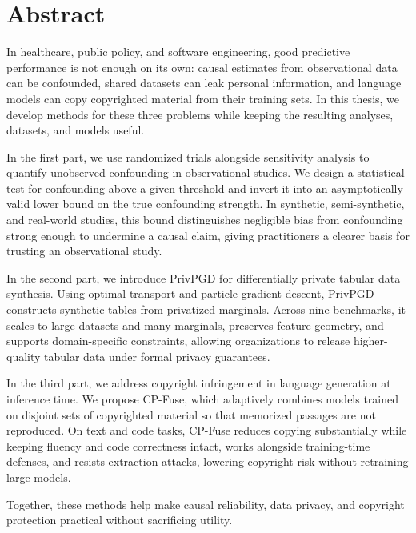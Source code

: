 \begingroup
\let\clearpage\relax
\let\cleardoublepage\relax
\chapter*{Abstract}

In healthcare, public policy, and software engineering, good predictive performance is not enough on its own: causal estimates from observational data can be confounded, shared datasets can leak personal information, and language models can copy copyrighted material from their training sets. In this thesis, we develop methods for these three problems while keeping the resulting analyses, datasets, and models useful.

In the first part, we use randomized trials alongside sensitivity analysis to quantify unobserved confounding in observational studies. We design a statistical test for confounding above a given threshold and invert it into an asymptotically valid lower bound on the true confounding strength. In synthetic, semi-synthetic, and real-world studies, this bound distinguishes negligible bias from confounding strong enough to undermine a causal claim, giving practitioners a clearer basis for trusting an observational study.

In the second part, we introduce PrivPGD for differentially private tabular data synthesis. Using optimal transport and particle gradient descent, PrivPGD constructs synthetic tables from privatized marginals. Across nine benchmarks, it scales to large datasets and many marginals, preserves feature geometry, and supports domain-specific constraints, allowing organizations to release higher-quality tabular data under formal privacy guarantees.

In the third part, we address copyright infringement in language generation at inference time. We propose CP-Fuse, which adaptively combines models trained on disjoint sets of copyrighted material so that memorized passages are not reproduced. On text and code tasks, CP-Fuse reduces copying substantially while keeping fluency and code correctness intact, works alongside training-time defenses, and resists extraction attacks, lowering copyright risk without retraining large models.

Together, these methods help make causal reliability, data privacy, and copyright protection practical without sacrificing utility.

\endgroup
